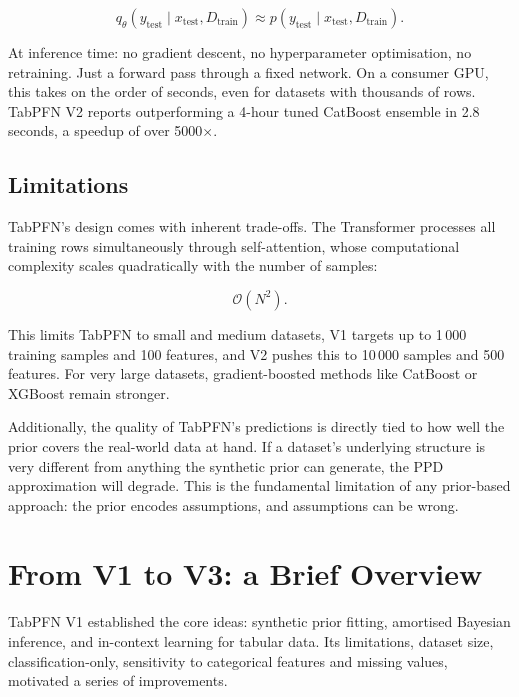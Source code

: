 \documentclass[12pt]{article}
\begin{document}
\[
q_\theta(y_{\text{test}} \mid x_{\text{test}}, D_{\text{train}}) \approx p(y_{\text{test}} \mid x_{\text{test}}, D_{\text{train}}).
\]

At inference time: no gradient descent, no hyperparameter optimisation, no retraining. Just a forward pass through a fixed network. On a consumer GPU, this takes on the order of seconds, even for datasets with thousands of rows. TabPFN V2 \cite{hollmann2025tabpfn} reports outperforming a 4-hour tuned CatBoost ensemble in 2.8 seconds,  a speedup of over 5000$\times$.

\subsection{Limitations}

TabPFN's design comes with inherent trade-offs. The Transformer processes all training rows simultaneously through self-attention, whose computational complexity scales quadratically with the number of samples:

\[
\mathcal{O}(N^2).
\]

This limits TabPFN to small and medium datasets,  V1 targets up to 1\,000 training samples and 100 features, and V2 pushes this to 10\,000 samples and 500 features. For very large datasets, gradient-boosted methods like CatBoost \cite{prokhorenkova2018catboost} or XGBoost \cite{chen2016xgboost} remain stronger.

Additionally, the quality of TabPFN's predictions is directly tied to how well the prior covers the real-world data at hand. If a dataset's underlying structure is very different from anything the synthetic prior can generate, the PPD approximation will degrade. This is the fundamental limitation of any prior-based approach: the prior encodes assumptions, and assumptions can be wrong.

\section{From V1 to V3: a Brief Overview}

TabPFN V1 \cite{hollmann2023tabpfn} established the core ideas: synthetic prior fitting, amortised Bayesian inference, and in-context learning for tabular data. Its limitations,  dataset size, classification-only, sensitivity to categorical features and missing values,  motivated a series of improvements.
\end{document}
